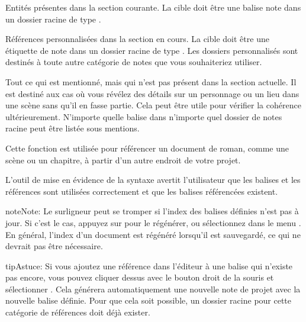 \documentclass[a4paper,11pt,french]{sphinxmanual}
\begin{document}
\begin{description}
\sphinxAtStartPar
Entités présentes dans la section courante. La cible doit être une balise note dans un dossier racine de type .

\sphinxAtStartPar
Références personnalisées dans la section en cours. La cible doit être une étiquette de note dans un dossier racine de type . Les dossiers personnalisés sont destinés à toute autre catégorie de notes que vous souhaiteriez utiliser.

\sphinxAtStartPar
Tout ce qui est mentionné, mais qui n’est pas présent dans la section actuelle. Il est destiné aux cas où vous révélez des détails sur un personnage ou un lieu dans une scène sans qu’il en fasse partie. Cela peut être utile pour vérifier la cohérence ultérieurement. N’importe quelle balise dans n’importe quel dossier de notes racine peut être listée sous mentions.

\sphinxAtStartPar
Cette fonction est utilisée pour référencer un document de roman, comme une scène ou un chapitre, à partir d’un autre endroit de votre projet.

\end{description}

\sphinxAtStartPar
L’outil de mise en évidence de la syntaxe avertit l’utilisateur que les balises et les références sont utilisées correctement et que les balises référencées existent.

\begin{sphinxadmonition}{note}{Note:}
\sphinxAtStartPar
Le surligneur peut se tromper si l’index des balises définies n’est pas à jour. Si c’est le cas, appuyez sur  pour le régénérer, ou sélectionnez  dans le menu . En général, l’index d’un document est régénéré lorsqu’il est sauvegardé, ce qui ne devrait pas être nécessaire.
\end{sphinxadmonition}

\begin{sphinxadmonition}{tip}{Astuce:}
\sphinxAtStartPar
Si vous ajoutez une référence dans l’éditeur à une balise qui n’existe pas encore, vous pouvez cliquer dessus avec le bouton droit de la souris et sélectionner . Cela générera automatiquement une nouvelle note de projet avec la nouvelle balise définie. Pour que cela soit possible, un dossier racine pour cette catégorie de références doit déjà exister.
\end{sphinxadmonition}
\end{document}
